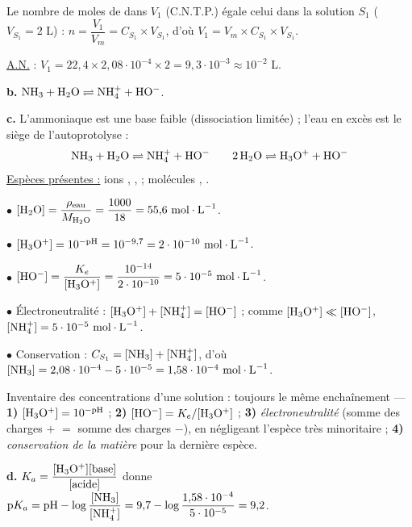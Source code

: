 \documentclass[11pt]{article}
\begin{document}

 Le nombre de moles de  dans $V_1$ (C.N.T.P.) égale celui dans la solution $S_1$ ($V_{S_1} = 2$ L) : $n = \dfrac{V_1}{V_m} = C_{S_1}\times V_{S_1}$, d'où $V_1 = V_m\times C_{S_1}\times V_{S_1}$.

\underline{A.N.} : $V_1 = 22{,}4\times 2{,}08\cdot10^{-4}\times 2 = 9{,}3\cdot10^{-3} \approx 10^{-2}$ L.

\textbf{b.} $\mathrm{NH_3 + H_2O \rightleftharpoons NH_4^+ + HO^-}$.

\textbf{c.} L'ammoniaque est une base faible (dissociation limitée) ; l'eau en excès est le siège de l'autoprotolyse :
\[ \mathrm{NH_3 + H_2O \rightleftharpoons NH_4^+ + HO^-} \qquad \mathrm{2\,H_2O \rightleftharpoons H_3O^+ + HO^-} \]
\underline{Espèces présentes :} ions , ,  ; molécules , .

$\bullet$ $[\ch{H_2O}] = \dfrac{\rho_{\text{eau}}}{M_{\ch{H_2O}}} = \dfrac{1000}{18} = 55{,}6\ \text{mol}\cdot\text{L}^{-1}$.

$\bullet$ $[\mathrm{H_3O^+}] = 10^{-\text{pH}} = 10^{-9{,}7} = 2\cdot10^{-10}\ \text{mol}\cdot\text{L}^{-1}$.

$\bullet$ $[\ch{HO^-}] = \dfrac{K_e}{[\ch{H_3O^+}]} = \dfrac{10^{-14}}{2\cdot10^{-10}} = 5\cdot10^{-5}\ \text{mol}\cdot\text{L}^{-1}$.

$\bullet$ Électroneutralité : $[\mathrm{H_3O^+}] + [\mathrm{NH_4^+}] = [\mathrm{HO^-}]$ ; comme $[\mathrm{H_3O^+}] \ll [\mathrm{HO^-}]$, $[\ch{NH_4^+}] = 5\cdot10^{-5}\ \text{mol}\cdot\text{L}^{-1}$.

$\bullet$ Conservation : $C_{S_1} = [\mathrm{NH_3}] + [\mathrm{NH_4^+}]$, d'où $[\ch{NH_3}] = 2{,}08\cdot10^{-4} - 5\cdot10^{-5} = 1{,}58\cdot10^{-4}\ \text{mol}\cdot\text{L}^{-1}$.

\begin{methode}
Inventaire des concentrations d'une solution : toujours le même
enchaînement — \textbf{1)} $[\mathrm{H_3O^+}] = 10^{-\text{pH}}$ ;
\textbf{2)} $[\mathrm{HO^-}] = K_e/[\mathrm{H_3O^+}]$ ;
\textbf{3)} \emph{électroneutralité} (somme des charges $+$ $=$ somme
des charges $-$), en négligeant l'espèce très minoritaire ;
\textbf{4)} \emph{conservation de la matière} pour la dernière espèce.
\end{methode}

\textbf{d.} $K_a = \dfrac{[\mathrm{H_3O^+}][\text{base}]}{[\text{acide}]}$ donne $\text{p}K_a = \text{pH} - \log\dfrac{[\mathrm{NH_3}]}{[\mathrm{NH_4^+}]} = 9{,}7 - \log\dfrac{1{,}58\cdot10^{-4}}{5\cdot10^{-5}} = 9{,}2$.
\end{document}

